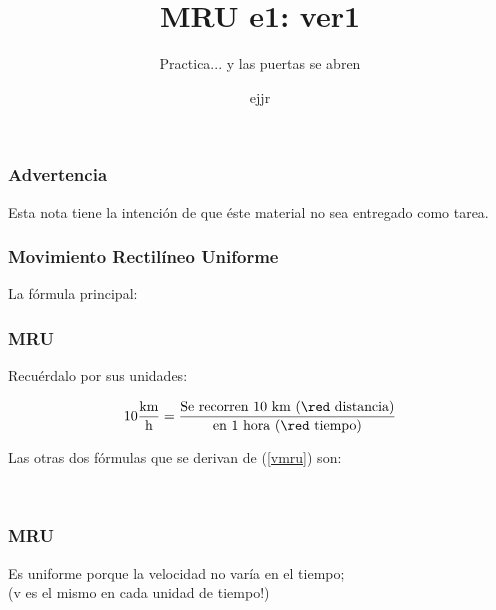 \documentclass{beamer}
\title{MRU e1: ver1}
\subtitle{Practica... y las puertas se abren}
\author{ejjr}
\begin{document}
\maketitle

\begin{frame}
\frametitle{Advertencia}
{\gray \large Esta nota tiene la intenci\'on de que \'este
material no sea entregado como tarea.}
\end{frame}

\begin{frame}
\frametitle{Movimiento Rectil\'ineo Uniforme}
La f\'ormula principal:

{\huge \vmru}

\vNUa
\end{frame}

\begin{frame}
\frametitle{MRU}
Recu\'erdalo por sus unidades:

\begin{equation*}
10\frac{\text{km}}{\text{h}} =
\frac{\text{Se recorren 10 km ({\red distancia})}}
{\text{en 1 hora ({\red tiempo})}}
\end{equation*}

Las otras dos f\'ormulas que se derivan de (\ref{vmru}) son:

{\large \xmru \\ \tmru}
\end{frame}

\begin{frame}
\frametitle{MRU}
Es uniforme porque la velocidad no var\'ia en el tiempo; \\
(v es el mismo en cada unidad de tiempo!)

\begin{center}
\end{center}
\end{frame}
\end{document}
